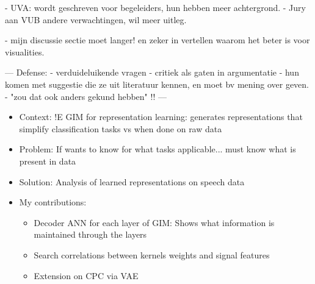 - UVA: wordt geschreven voor begeleiders, hun hebben meer achtergrond.
- Jury aan VUB andere verwachtingen, wil meer uitleg.

- mijn discussie sectie moet langer! en zeker in vertellen waarom het beter is voor visualities.

---
Defense:
- verduideluikende vragen
- critiek als gaten in argumentatie
- hun komen met suggestie die ze uit literatuur kennen, en moet bv mening over geven.
- "zou dat ook anders gekund hebben"
!!
---




\begin{itemize}
	\item Context: !E GIM for representation learning: generates representations that simplify classification tasks vs when done on raw data
	\item Problem: If wants to know for what tasks applicable... must know what is present in data
	\item Solution: Analysis of learned representations on speech data
	\item My contributions: 
	\begin{itemize}
		\item Decoder ANN for each layer of GIM: Shows what information is maintained through the layers
		\item Search correlations between kernels weights and signal features
		\item Extension on CPC via VAE
	\end{itemize}
\end{itemize}



